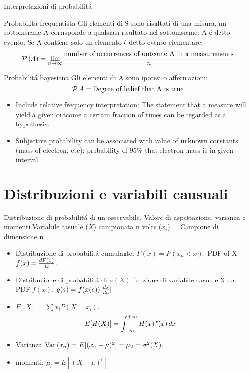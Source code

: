 \begin{frame}{Interpretazioni di probabilit\'a}
\begin{block}{Probabilit\'a frequentista}
Gli elementi di S sono risultati di una misura, un sottoinsieme A corrisponde a qualsiasi risultato nel sottoinsieme: A \'e detto evento. Se A contiene solo un elemento \'e detto evento elementare:
\begin{equation*}
\prob{(A)}=\lim_{n\to\infty}\frac{\text{number of occurrences of outcome A in n measurements}}{n}
\end{equation*}
\end{block}
\begin{block}{Probabilit\'a bayesiana }
Gli elementi di A sono ipotesi o affermazioni:
\begin{equation*}
\prob{A}=\text{Degree of belief that A is true}
\end{equation*}
\begin{itemize}
\item Include relative frequency interpretation: The statement that a measure will yield a given outcome a certain fraction of times can be regarded as a hypothesis.
\item Subjective probability can be associated with value of unknown constants (mass of electron, etc): probability of $95\%$ that electron mass is in given interval.
\end{itemize}
\end{block}
\end{frame}

\section{Distribuzioni e variabili causuali}

\begin{frame}{Distribuzione di probabilit\'a di un osservabile. Valore di aspettazione, varianza e momenti}
Variabile casuale ($X$) campionata n volte ($x_i$) = Campione di dimensione n
\begin{itemize}
\item Distribuzione di probabilit\'a cumulante: $F(x)=P(x_n<x)$: PDF of X $f(x)=\TDy{x}{F(x)}$.
\item Distribuzione di probabilit\'a di $a(X)$ funzione di variabile casuale X con PDF $f(x)$: $g(a)=f(x(a))|\TDy{a}{x}|$
\item $E[X]=\sum x_iP(X=x_i)$.
\begin{align*}
&E[H(X)]=\intsinf{}H(x)f(x)\,dx
\end{align*}
\item Varianza $\var{(x_n)}=E[(x_n-\mu)^2]=\mu_2=\sigma^2(X)$.
\item momenti: $\mu_l=E[(X-\mu)^l]$
\end{itemize}
\end{frame}

